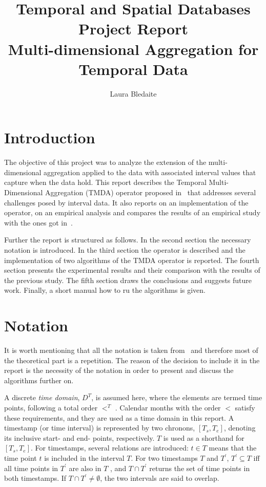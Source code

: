 \documentclass[a4paper,11pt]{article}
\begin{document}
\title{
  \textbf{\large Temporal and Spatial Databases Project Report}\\
  Multi-dimensional Aggregation for Temporal Data
}

\author{Laura Bledaite}
\maketitle

\section{Introduction}

The objective of this project was to analyze the extension of the multi-dimensional aggregation applied to the data with associated interval values that capture when the data hold. This report describes the Temporal Multi-Dimensional Aggregation (TMDA) operator proposed in~\cite{bohlen} that addresses several challenges posed by interval data. It also reports on an implementation of the operator, on an empirical analysis and compares the results of an empirical study with the ones got in~\cite{bohlen}.

Further the report is structured as follows. In the second section the necessary notation is introduced. In the third section the operator is described and the implementation of two algorithms of the TMDA operator is reported. The fourth section presents the experimental results and their comparison with the results of the previous study. The fifth section draws the conclusions and suggests future work. Finally, a short manual how to ru the algorithms is given.

\section{Notation}

It is worth mentioning that all the notation is taken from~\cite{bohlen} and therefore most of the theoretical part is a repetition. The reason of the decision to include it in the report is the necessity of the notation in order to present and discuss the algorithms further on.
 
A discrete \textit{time domain}, $D^{T}$, is assumed here, where the elements are termed time points, following a total order $<^{T}$ . Calendar months with the order $<$ satisfy these requirements, and they are used as a time domain in this report. A timestamp (or time interval) is represented by two chronons, $[T_s, T_e ]$, denoting its inclusive start- and end- points, respectively. $T$ is used as a shorthand for $[T_s, T_e ]$. For timestamps, several relations are introduced: $t \in T$ means that the time point $t$ is included in the interval $T$. For two timestamps $T$ and $T^{'}$, $T^{'} \subseteq T$ iff all time points in $T^{'}$ are also in $T$ , and $T \cap T^{'}$ returns the set of time points in both timestamps. If $T \cap T^{'} \neq \emptyset$, the two intervals are said to overlap.
\end{document}
